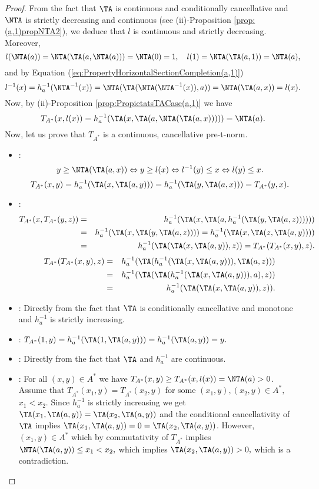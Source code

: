 \begin{proof}
	From the fact that $\TA$ is continuous and conditionally cancellative and $\NTA$ is strictly decreasing and continuous (see (ii)-Proposition \ref{prop:(a,1)propNTA2}), we deduce that $l$ is continuous and strictly decreasing. Moreover,
	$$l(\NTA(a))=\NTA(\TA(a,\NTA(a)))=\NTA(0)=1, \quad l(1)=\NTA(\TA(a,1))=\NTA(a),$$
	and by Equation (\ref{eq:PropertyHorizontalSectionCompletion(a,1)})
	$$l^{-1}(x)=h_a^{-1}(\NTA^{-1}(x))=\NTA(\TA(\NTA(\NTA^{-1}(x)),a)) = \NTA(\TA(a,x))=l(x).$$
	Now, by (ii)-Proposition \ref{prop:PropietatsTACase(a,1)} we have
	$$T_{A^*}(x,l(x))= h_a^{-1}(\TA(x,\TA(a,\NTA(\TA(a,x)))))=\NTA(a).
	$$
	Now, let us prove that $T_{A^*}$ is a continuous, cancellative pre-t-norm.
	\begin{itemize}
		\item \underline{}:
		$$ y \geq \NTA(\TA(a,x)) \Leftrightarrow y \geq l(x) \Leftrightarrow l^{-1}(y) \leq x \Leftrightarrow l(y) \leq x.$$
		$$T_{A^*}(x,y)=h_a^{-1}(\TA(x,\TA(a,y))) = h_a^{-1}(\TA(y,\TA(a,x))) = T_{A^*}(y,x).$$
		\item \underline{}:
		\begin{eqnarray*}
			T_{A^*}(x,T_{A^*}(y,z))&=&h_a^{-1}(\TA(x,\TA(a,h_a^{-1}(\TA(y,\TA(a,z)))))) \\
			& = & h_a^{-1}(\TA(x,\TA(y,\TA(a,z)))) = h_a^{-1}(\TA(x,\TA(z,\TA(a,y)))) \\
			& = & h_a^{-1}(\TA(\TA(x,\TA(a,y)),z)) = T_{A^*}(T_{A^*}(x,y),z).
		\end{eqnarray*}
		\begin{eqnarray*}
			T_{A^*}(T_{A^*}(x,y),z) &=& h_a^{-1}(\TA(h_a^{-1}(\TA(x,\TA(a,y))),\TA(a,z)))\\ 
			& = & h_a^{-1}(\TA(\TA(h_a^{-1}(\TA(x,\TA(a,y))),a),z)) \\
			& = &
			h_a^{-1}(\TA(\TA(x,\TA(a,y)),z)).
		\end{eqnarray*}
		\item \underline{}: Directly from the fact that $\TA$ is conditionally cancellative and monotone and $h_a^{-1}$ is strictly increasing.
		\item \underline{}: $T_{A^*}(1,y) = h_a^{-1}(\TA(1,\TA(a,y))) = h_a^{-1}(\TA(a,y))=y.$
		\item \underline{}: Directly from the fact that $\TA$ and $h_a^{-1}$ are continuous.
		\item \underline{}: For all $(x,y) \in A^*$ we have $T_{A^*}(x,y) \geq T_{A^*}(x,l(x)) = \NTA(a)>0$.  Assume that
		$T_{A^*}(x_1,y)=T_{A^*}(x_2,y)$ for some $(x_1,y),(x_2,y)\in A^*,$ $x_1<x_2.$ Since $h_a^{-1}$ is strictly increasing we get
		$\TA(x_1,\TA(a,y)) = \TA(x_2,\TA(a,y))$ and the conditional cancellativity of $\TA$ implies $\TA(x_1,\TA(a,y)) = 0 = \TA(x_2,\TA(a,y))$.
		However, $(x_1,y)\in A^*$ which by commutativity of $T_{A^*}$ implies $\NTA(\TA(a,y))\leq x_1<x_2,$ which implies $\TA(x_2,\TA(a,y))>0,$ which is a contradiction. \qedhere
	\end{itemize}
\end{proof}

